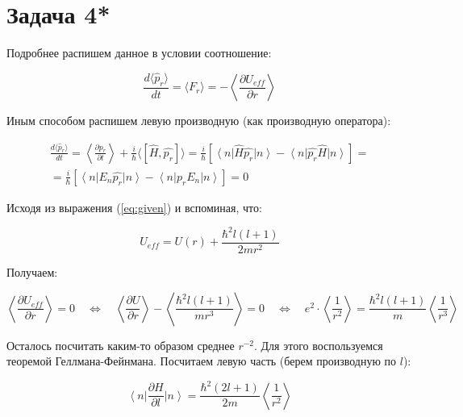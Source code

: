 \documentclass[a4paper, 12pt]{article}
\newcommand{\qlrq}
{\ensuremath{\quad \Leftrightarrow \quad}} %
\newcommand{\bra}[1]
{\ensuremath{\left\langle#1\right|}}
\newcommand{\cat}[1]
{\ensuremath{\left|#1\right\rangle}}
\begin{document}
\section*{Задача 4*}

Подробнее распишем данное в условии соотношение:

\begin{equation}
	\frac{d\langle\hat{p}_r\rangle}{dt} = \langle F_r \rangle = - \left \langle \frac{\partial U_{eff}}{\partial r} \right \rangle
	\label{eq:given}
\end{equation}

Иным способом распишем левую производную (как производную оператора):

\begin{align*}
	\frac{d\langle\hat{p}_r\rangle}{dt} = \left\langle \frac{\partial p_r}{\partial t}\right\rangle + \frac{i}{\hbar} \langle [\hat{H}, \hat{p_r}] \rangle = \frac{i}{\hbar} \left[\bra{n} \hat{H}\hat{p_r} \cat {n} - \bra{n} \hat{p_r}\hat{H} \cat{n} \right] = \\
	= \frac{i}{\hbar}\left[\bra{n} E_n\hat{p_r} \cat {n} - \bra{n} \hat{p_r}E_n \cat{n} \right] = 0
\end{align*}

Исходя из выражения (\ref{eq:given}) и вспоминая, что:

\begin{equation*}
	U_{eff} = U(r) + \frac{\hbar^2 l (l+1)}{2 m r^2}
\end{equation*}

Получаем:

\begin{equation}
	\left \langle \frac{\partial U_{eff}}{\partial r} \right \rangle = 0 \qlrq \left \langle \frac{\partial U}{\partial r} \right \rangle - \left \langle \frac{\hbar^2 l(l+1)}{mr^3} \right \rangle = 0 \qlrq e^2 \cdot \left \langle \frac{1}{r^2} \right \rangle = \frac{\hbar^2 l (l+1)}{m} \left \langle \frac{1}{r^3} \right \rangle
	\label{eq:semi_final}
\end{equation}

Осталось посчитать каким-то образом среднее $r^{-2}$. Для этого воспользуемся теоремой Геллмана-Фейнмана. Посчитаем левую часть (берем производную по $l$):

\begin{equation}
	\bra{n}\frac{\partial H}{\partial l}\cat{n} = \frac{\hbar^2 (2l+1)}{2m}\left \langle \frac{1}{r^2} \right \rangle
	\label{eq:left}
\end{equation}
\end{document}
